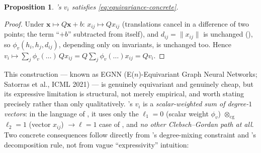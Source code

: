 \documentclass[11pt,a4paper]{report}
\newtheorem{proposition}[proposition]{Proposition}
\theoremstyle{definition}
\theoremstyle{remark}
\begin{document}
\begin{proposition}
's $v_i$ satisfies \eqref{eq:equivariance-concrete}.
\end{proposition}

\begin{proof}
Under $\mathbf x\mapsto Q\mathbf x+b$: $x_{ij}\mapsto Qx_{ij}$ (translations
cancel in a difference of two points; the term ``$+b$'' subtracted from
itself), and $d_{ij}=\|x_{ij}\|$ is unchanged (), so
$\phi_v(h_i,h_j,d_{ij})$, depending only on invariants, is unchanged too.
Hence $v_i\mapsto\sum_j\phi_v(\dots)\,Qx_{ij} = Q\sum_j\phi_v(\dots)x_{ij}=Qv_i$.
\end{proof}

This construction --- known as EGNN (E($n$)-Equivariant Graph Neural
Networks; Satorras et al., ICML 2021) --- is genuinely equivariant and
genuinely cheap, but its expressive limitation is structural, not merely
empirical, and worth stating precisely rather than only qualitatively.
's $v_i$ is a \emph{scalar-weighted sum of degree-$1$
vectors}: in the language of , it uses only the
$\ell_1=0$ (scalar weight $\phi_v$) $\otimes_{\mathrm{cg}}$ $\ell_2=1$
(vector $x_{ij}$) $\to\ell=1$ case of , and
\emph{no other Clebsch--Gordan path at all}. Two concrete
consequences follow directly from 's
degree-mixing constraint and 's decomposition
rule, not from vague ``expressivity'' intuition:
\end{document}
